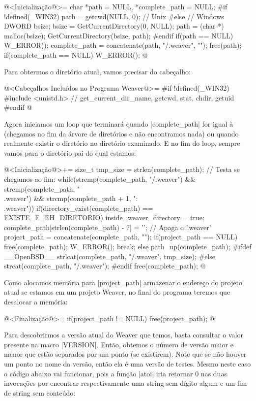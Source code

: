 {\iniciocodigo
@<Inicialização@>=
char *path = NULL, *complete_path = NULL;
#if !defined(_WIN32)
path = getcwd(NULL, 0); // Unix
#else
{ // Windows
  DWORD bsize;
  bsize = GetCurrentDirectory(0, NULL);
  path = (char *) malloc(bsize);
  GetCurrentDirectory(bsize, path);
}
#endif
if(path == NULL) W_ERROR();
complete_path = concatenate(path, "/.weaver", "");
free(path);
if(complete_path == NULL) W_ERROR();
@
\fimcodigo

Para obtermos o diretório atual, vamos precisar do cabeçalho:

\iniciocodigo
@<Cabeçalhos Incluídos no Programa Weaver@>=
#if !defined(_WIN32)
#include <unistd.h> // get_current_dir_name, getcwd, stat, chdir, getuid
#endif
@
\fimcodigo

Agora iniciamos um loop que terminará quando |complete_path| for igual
à  (chegamos no fim da árvore de diretórios e não
encontramos nada) ou quando realmente existir o
diretório  no diretório examinado. E no fim do
loop, sempre vamos para o diretório-pai do qual estamos:

\iniciocodigo
@<Inicialização@>+=
{
  size_t tmp_size = strlen(complete_path);
  // Testa se chegamos ao fim:
  while(strcmp(complete_path, "/.weaver") &&
	strcmp(complete_path, "\\.weaver") &&
	strcmp(complete_path + 1, ":\\.weaver")){
    if(directory_exist(complete_path) == EXISTE_E_EH_DIRETORIO){
      inside_weaver_directory = true;
      complete_path[strlen(complete_path) - 7] = '\0'; // Apaga o '.weaver'
      project_path = concatenate(complete_path, "");
      if(project_path == NULL){ free(complete_path); W_ERROR(); }
      break;
    }
    else{
      path_up(complete_path);
#ifdef __OpenBSD__
      strlcat(complete_path, "/.weaver", tmp_size);
#else
      strcat(complete_path, "/.weaver");
#endif
    }
  }
  free(complete_path);
}
@
\fimcodigo

Como alocamos memória para |project_path| armazenar o endereço do
projeto atual se estamos em um projeto Weaver, no final do programa
teremos que desalocar a memória:

\iniciocodigo
@<Finalização@>=
if(project_path != NULL) free(project_path);
@
\fimcodigo


Para descobrirmos a versão atual do Weaver que temos, basta consultar
o valor presente na macro |VERSION|. Então, obtemos o número de versão
maior e menor que estão separados por um ponto (se existirem). Note
que se não houver um ponto no nome da versão, então ela é uma versão
de testes. Mesmo neste caso o código abaixo vai funcionar, pois a
função |atoi| iria retornar 0 nas duas invocações por encontrar
respectivamente uma string sem dígito algum e um fim de string sem
conteúdo:

}
